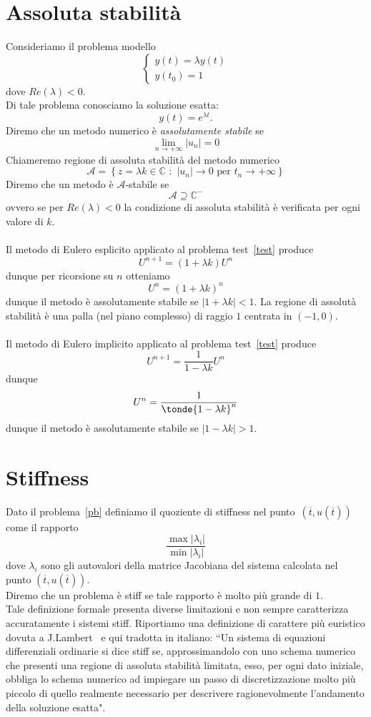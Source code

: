 \section{Assoluta stabilit\`a}
Consideriamo il problema modello 
$$ \label{test}\begin{cases}y(t) = \lambda y(t) \\
y\left(t_0\right) = 1
\end{cases}
$$
dove $Re(\lambda) <0$.\\
Di tale problema conosciamo la soluzione esatta:  $$y(t) = e^{\lambda t}.$$
Diremo che un metodo numerico \`e \textit{assolutamente stabile} se 
$$ \lim_{n\to + \infty} \left| u_n \right| = 0 $$ 
Chiameremo  regione di assoluta stabilit\`a del metodo numerico 
$$\mathcal{A}=\left\{ z = \lambda k \in \mathbb{C}\,\, :\,\, | u_n| \to 0 \text{ per } t_n \to +\infty\right\}$$ 
Diremo che un metodo \`e $\mathcal{A}$-stabile se 
$$ \mathcal{A}\supseteq \mathbb{C}^-$$
ovvero se per $Re(\lambda)<0$ la condizione di assoluta stabilit\`a \`e verificata per ogni valore di $k$. \\ \\
Il metodo di Eulero esplicito applicato al problema test~\eqref{test} produce
$$ U^{n+1} = (1 + \lambda k) U^n$$
dunque per ricorsione su $n$ otteniamo 
$$ U^n = (1 + \lambda k)^n $$ 
dunque il metodo \`e assolutamente stabile se $ | 1 + \lambda k |< 1$.  La regione di assolut\`a stabilit\`a \`e una palla (nel piano complesso) di raggio $1$ centrata in $(-1,0)$.\\ \\

Il metodo di Eulero implicito  applicato al problema test~\eqref{test} produce 
$$ U^{n+1} = \frac{1}{1-\lambda k} U^n$$
dunque 
$$ U^n = \frac{ 1}{\tonde{ 1 - \lambda k}^n}$$
dunque il metodo \`e assolutamente stabile se $| 1 - \lambda k| >1$.
\section{Stiffness}
Dato il problema~\eqref{pb} definiamo il quoziente di stiffness nel punto~$\left(\overline{t},u\left(\overline{t}\right)\right)$  come il rapporto 
 $$ \frac{ \max \vert\lambda_i \vert }{\min \vert \lambda_i \vert}$$ 
 dove $\lambda_i$ sono gli autovalori della matrice Jacobiana del sistema calcolata nel punto  $\left(\overline{t},u\left(\overline{t}\right)\right)$.\\
 Diremo che un problema \`e stiff se tale rapporto \`e molto pi\`u grande di $1$.\\
Tale definizione formale presenta diverse limitazioni e non sempre caratterizza accuratamente i sistemi stiff.  Riportiamo una definizione di carattere pi\`u euristico dovuta a J.Lambert~\cite{lambert1991numerical} e qui tradotta in italiano:
``Un sistema di equazioni differenziali ordinarie si dice stiff se, 
approssimandolo con uno schema numerico che presenti una regione di assoluta stabilit\`a limitata, esso, per ogni dato iniziale, obbliga lo schema numerico ad impiegare un passo di discretizzazione molto pi\`u piccolo di quello realmente necessario per descrivere ragionevolmente l'andamento della soluzione esatta".
